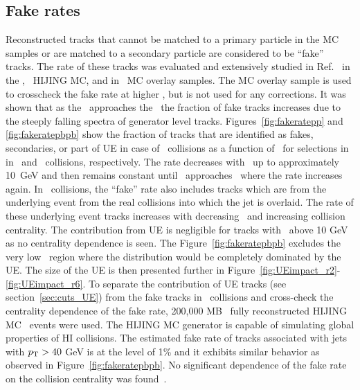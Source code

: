 \subsection{Fake rates}
\label{sec:fakerates}
Reconstructed tracks that cannot be matched to a primary particle in the MC samples or are matched to a secondary particle are considered to be ``fake'' tracks.
The rate of these tracks was evaluated and extensively studied in Ref.~\cite{PhysRevC.98.024908} in the \pp, \pbpb\ HIJING MC, and in \pbpb\ MC overlay samples.
The MC overlay sample is used to crosscheck the fake rate at higher \pt, but is not used for any corrections.
It was shown that as the \pttrk\ approaches the  \ptjet\ the fraction of fake tracks increases due to the steeply falling spectra of generator level tracks.
Figures~\ref{fig:fakeratepp} and \ref{fig:fakeratepbpb} show the fraction of tracks that are identified as fakes, secondaries, or part of UE in case of \PbPb\ collisions as a function of \pttrk\ for selections in \ptjet in \pp\ and \pbpb\ collisions, respectively.
The rate decreases with \pttrk\ up to approximately 10~GeV and then remains constant until \pttrk\ approaches \ptjet\ where the rate increases again.
In \pbpb\ collisions, the ``fake'' rate also includes tracks which are from the underlying event from the real collisions into which the jet is overlaid.
The rate of these underlying event tracks increases with decreasing \pttrk\ and increasing collision centrality.
The contribution from UE is negligible for tracks with \pT\ above 10 GeV as no centrality dependence is seen.
The Figure~\ref{fig:fakeratepbpb} excludes the very low \pT\ region where the distribution would be completely dominated by the UE.
The size of the UE is then presented further in Figure~\ref{fig:UEimpact_r2}-\ref{fig:UEimpact_r6}.
To separate the contribution of UE tracks (see section~\ref{sec:cuts_UE}) from the fake tracks in \PbPb\ collisions and cross-check the centrality dependence of the fake rate, 200,000 MB \PbPb\ fully reconstructed HIJING MC~\cite{Wang:1991hta} events were used.
The HIJING MC generator is capable of simulating global properties of HI collisions.
The estimated fake rate of tracks associated with jets with $\mbox{$p_{\mathrm{T}}$}>40$ GeV is at the level of 1\% and it exhibits similar behavior as observed in Figure~\ref{fig:fakeratepbpb}.
No significant dependence of the fake rate on the collision centrality was found~\cite{PhysRevC.98.024908}.

